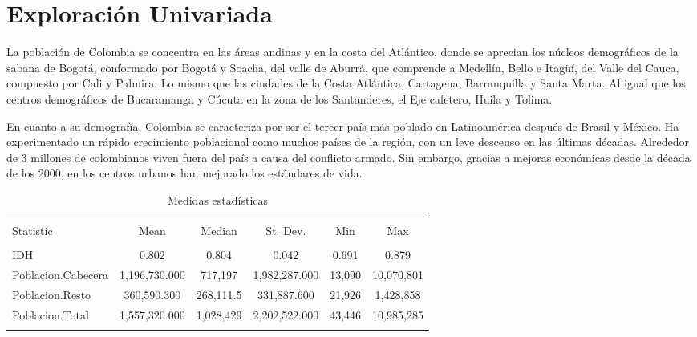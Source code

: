 \section{Exploración Univariada}\label{univariada}




La población de Colombia se concentra en las áreas andinas y en la costa del Atlántico, donde se aprecian los núcleos demográficos de la sabana de Bogotá, conformado por Bogotá y Soacha, del valle de Aburrá, que comprende a Medellín, Bello e Itagüí, del Valle del Cauca, compuesto por Cali y Palmira. Lo mismo que las ciudades de la Costa Atlántica, Cartagena, Barranquilla y Santa Marta. Al igual que los centros demográficos de Bucaramanga y Cúcuta en la zona de los Santanderes, el Eje cafetero, Huila y Tolima.

En cuanto a su demografía, Colombia se caracteriza por ser el tercer país más poblado en Latinoamérica después de Brasil y México. Ha experimentado un rápido crecimiento poblacional como muchos países de la región, con un leve descenso en las últimas décadas. Alrededor de 3 millones de colombianos viven fuera del país a causa del conflicto armado. Sin embargo, gracias a mejoras económicas desde la década de los 2000, en los centros urbanos han mejorado los estándares de vida.

\begin{table}[!htbp] \centering 
  \caption{Medidas estadísticas} 
  \label{stats} 
\begin{tabular}{@{\extracolsep{5pt}}lccccc} 
\\[-1.8ex]\hline 
\hline \\[-1.8ex] 
Statistic & \multicolumn{1}{c}{Mean} & \multicolumn{1}{c}{Median} & \multicolumn{1}{c}{St. Dev.} & \multicolumn{1}{c}{Min} & \multicolumn{1}{c}{Max} \\ 
\hline \\[-1.8ex] 
IDH & 0.802 & 0.804 & 0.042 & 0.691 & 0.879 \\ 
Poblacion.Cabecera & 1,196,730.000 & 717,197 & 1,982,287.000 & 13,090 & 10,070,801 \\ 
Poblacion.Resto & 360,590.300 & 268,111.5 & 331,887.600 & 21,926 & 1,428,858 \\ 
Poblacion.Total & 1,557,320.000 & 1,028,429 & 2,202,522.000 & 43,446 & 10,985,285 \\ 
\hline \\[-1.8ex] 
\end{tabular} 
\end{table} 




